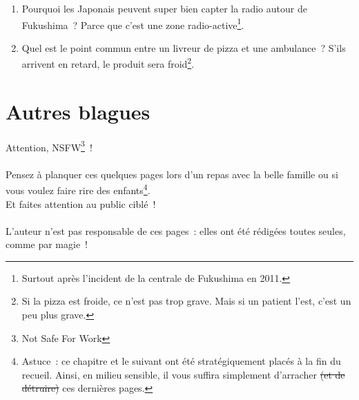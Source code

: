 \documentclass[10pt,a5paper,fullpage]{book}
\begin{document}
\begin{enumerate}
	\item Pourquoi les Japonais peuvent super bien capter la radio autour de Fukushima~? Parce que c'est une zone radio-active\footnote{Surtout après l'incident de la centrale de Fukushima en 2011.}. 
	
	\item Quel est le point commun entre un livreur de pizza et une ambulance~? S’ils arrivent en retard, le produit sera froid\footnote{Si la pizza est froide, ce n'est pas trop grave. Mais si un patient l'est, c'est un peu plus grave.}. 
\end{enumerate}
	
\chapter{Autres blagues}
Attention, NSFW\footnote{Not Safe For Work}~! \\ \\
Pensez à planquer ces quelques pages lors d'un repas avec la belle famille ou si vous voulez faire rire des enfants\footnote{Astuce~: ce chapitre et le suivant ont été stratégiquement placés à la fin du recueil. Ainsi, en milieu sensible, il vous suffira simplement d'arracher \sout{(et de détruire)} ces dernières pages.}. \\Et faites attention au public ciblé~! 
\\ \\L'auteur n'est pas responsable de ces pages~: elles ont été rédigées toutes seules, comme par magie~!
\newpage
\end{document}

